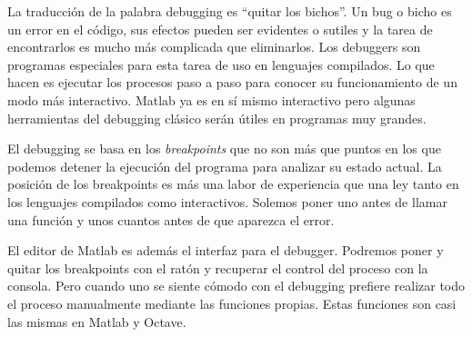 La traducción de la palabra debugging es ``quitar los bichos''.  Un
bug o bicho es un error en el código, sus efectos pueden ser evidentes
o sutiles y la tarea de encontrarlos es mucho más complicada que
eliminarlos.  Los debuggers son programas especiales para esta tarea
de uso en lenguajes compilados. Lo que hacen es ejecutar los procesos
paso a paso para conocer su funcionamiento de un modo más interactivo.
Matlab ya es en sí mismo interactivo pero algunas herramientas del
debugging clásico serán útiles en programas muy grandes.

El debugging se basa en los \emph{breakpoints} que no son más que
puntos en los que podemos detener la ejecución del programa para
analizar su estado actual. La posición de los breakpoints es más una
labor de experiencia que una ley tanto en los lenguajes compilados
como interactivos. Solemos poner uno antes de llamar una función y
unos cuantos antes de que aparezca el error.

El editor de Matlab es además el interfaz para el debugger. Podremos
poner y quitar los breakpoints con el ratón y recuperar el control del
proceso con la consola. Pero cuando uno se siente cómodo con el
debugging prefiere realizar todo el proceso manualmente mediante las
funciones propias. Estas funciones son casi las mismas en Matlab y
Octave.

